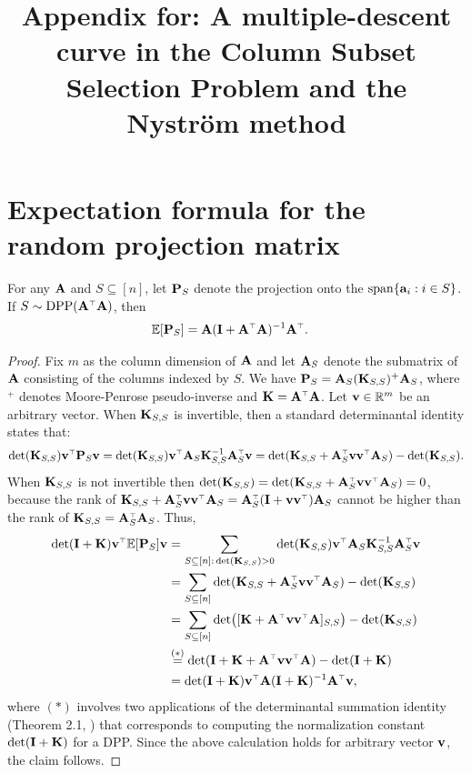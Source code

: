 \documentclass{article}
\title{\textbf{Appendix for:} A multiple-descent curve in the Column Subset Selection
  Problem
  and the Nystr\"om method}
\date{}
\begin{document}
  \maketitle

  \appendix

  \section{Expectation formula for the random projection matrix}
  \begin{theorem}\label{l:expectation_proj}
  For any $\A$ and $S\subseteq [n]$, let $\P_S$ denote the  
projection onto the $\mathrm{span}\{\a_i:i\in S\}$. If $S\sim \DPP(\A^\top\A)$, then
\begin{align*}
  \E[\P_S] & = \A(\I+\A^\top\A)^{-1}\A^\top.
\end{align*}
\end{theorem}
\begin{proof}
Fix $m$ as the column dimension of $\A$ and let $\A_S$ denote the
submatrix of $\A$ consisting of the columns 
indexed by $S$. We have $\P_S=\A_S(\K_{S,S})^+\A_S$, where $^+$
denotes Moore-Penrose pseudo-inverse and $\K=\A^\top\A$. Let
$\v\in\R^m$ be an arbitrary vector. When $\K_{S,S}$ is
invertible, then a standard determinantal 
identity states that:
  \begin{align*}
\det(\K_{S,S})\v^\top\P_S\v
    =\det(\K_{S,S})\v^\top\A_S\K_{S,S}^{-1}\A_S^\top\v = \det(\K_{S,S}+\A_S^\top\v\v^\top\A_S)-\det(\K_{S,S}).
  \end{align*}
When $\K_{S,S}$ is not invertible then
$\det(\K_{S,S})=\det(\K_{S,S}+\A_S^\top\v\v^\top\A_S)=0$, because the
rank of $\K_{S,S}+\A_S^\top\v\v^\top\A_S=\A_S^\top(\I+\v\v^\top)\A_S$
cannot be higher than the rank of $\K_{S,S}=\A_S^\top\A_S$. Thus,
\begin{align*}
  \det(\I+\K)\v^\top\E[\P_S]\v
  &= \sum_{S\subseteq[n]:\,\det(\K_{S,S})>0}\det(\K_{S,S})
\v^\top\A_S\K_{S,S}^{-1}\A_S^\top\v\\
  &=\sum_{S\subseteq[n]}\det(\K_{S,S}+\A_S^\top\v\v^\top\A_S)-\det(\K_{S,S})\\
  &=\sum_{S\subseteq[n]}\det\!\big([\K+\A^\top\v\v^\top\A]_{S,S}\big)-\det(\K_{S,S})\\
  &\overset{(*)}{=}\det(\I + \K + \A^\top\v\v^\top\A) - \det(\I+\K)\\
  &=\det(\I+\K)\v^\top\A(\I+\K)^{-1}\A^\top\v,
\end{align*}
where $(*)$ involves two applications of the determinantal summation identity (Theorem
2.1, \cite{Kulesza2012book}) that corresponds to computing the
normalization constant $\det(\I+\K)$ for a DPP. Since the above
calculation holds for arbitrary vector $\v$, the claim follows.
\end{proof}
\end{document}
